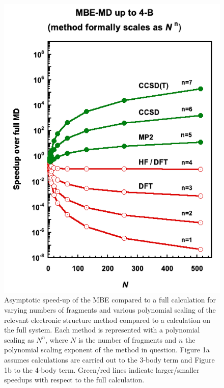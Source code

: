 \documentclass[11pt, proquest]{uwthesis}[2020/02/24]
\begin{document}
\begin{figure}[t]
\begin{center}
\begin{minipage}{0.45\textwidth}
\includegraphics[width=\textwidth]{Figures/Chapter_4/ch4_figure_1_right.png}
\end{minipage}
\end{center}
\caption[Asymptotic speed-up of the MBE compared to a full calculation for varying numbers of fragments and various polynomial scaling of the relevant electronic structure method compared to a calculation on the full system. Each method is represented with a polynomial scaling as $N^n$, where $N$ is the number of fragments and $n$ the polynomial scaling exponent of the method in question.]{Asymptotic speed-up of the MBE compared to a full calculation for varying numbers of fragments and various polynomial scaling of the relevant electronic structure method compared to a calculation on the full system. Each method is represented with a polynomial scaling as $N^n$, where $N$ is the number of fragments and $n$ the polynomial scaling exponent of the method in question. Figure 1a assumes calculations are carried out to the 3-body term and Figure 1b to the 4-body term. Green/red lines indicate larger/smaller speedups with respect to the full calculation.}
\label{fig:MBE_MD_F1}
\end{figure}
\end{document}
